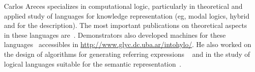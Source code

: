 

Carlos Areces specializes in computational logic, particularly in
theoretical and applied study of languages for knowledge representation (eg,
modal logics, hybrid and for the description). The most important publications
on theoretical aspects in these languages are~\cite{ABM01,arec:hybr05b}.
Demonstrators also developed machines for these
languages~\cite{ANR01,arec:hylo02a,AG06,Hoffmann2007} accessibles in
\url{http://www.glyc.dc.uba.ar/intohylo/}. He also worked
on the design of algorithms for generating referring expressions ~\cite{AKS08}
and in the study of logical languages suitable for the semantic
representation~\cite{AF08}.


